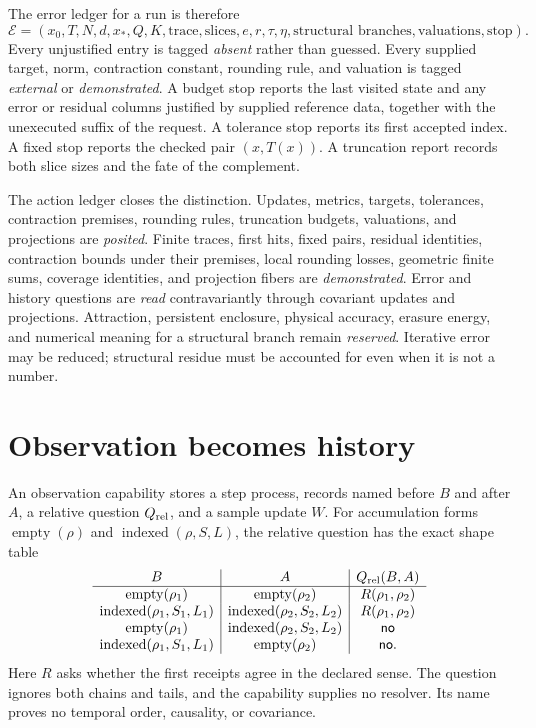 The error ledger for a run is therefore
\[
 \mathcal E=(x_0,T,N,d,x_*,Q,K,\text{trace},\text{slices},
             e,r,\tau,\eta,\text{structural branches},\text{valuations},\text{stop}).
\]
Every unjustified entry is tagged \emph{absent} rather than guessed.  Every supplied target, norm, contraction
constant, rounding rule, and valuation is tagged \emph{external} or \emph{demonstrated}.  A budget stop reports the
last visited state and any error or residual columns justified by supplied reference data, together with the
unexecuted suffix of the request.  A tolerance stop reports its first accepted index.  A fixed stop reports the checked
pair \((x,T(x))\).  A truncation report records both slice sizes and the fate of the complement.

The action ledger closes the distinction.  Updates, metrics, targets, tolerances, contraction premises, rounding rules,
truncation budgets, valuations, and projections are \emph{posited}.  Finite traces, first hits, fixed pairs, residual
identities, contraction bounds under their premises, local rounding losses, geometric finite sums, coverage identities,
and projection fibers are \emph{demonstrated}.  Error and history questions are \emph{read}
contravariantly through covariant updates and projections.  Attraction, persistent enclosure, physical accuracy,
erasure energy, and numerical meaning for a structural branch remain \emph{reserved}.  Iterative error may be reduced;
structural residue must be accounted for even when it is not a number.

\section{Observation becomes history}

An observation capability stores a step process, records named before \(B\) and after \(A\), a relative question
\(Q_{\rm rel}\), and a sample update \(W\).  For accumulation forms
\(\operatorname{empty}(\rho)\) and \(\operatorname{indexed}(\rho,S,L)\), the relative question has the exact shape table
\[
\begin{array}{c|c|c}
B&A&Q_{\rm rel}(B,A)\\
\hline
\operatorname{empty}(\rho_1)&\operatorname{empty}(\rho_2)&R(\rho_1,\rho_2)\\
\operatorname{indexed}(\rho_1,S_1,L_1)&\operatorname{indexed}(\rho_2,S_2,L_2)&R(\rho_1,\rho_2)\\
\operatorname{empty}(\rho_1)&\operatorname{indexed}(\rho_2,S_2,L_2)&\mathsf{no}\\
\operatorname{indexed}(\rho_1,S_1,L_1)&\operatorname{empty}(\rho_2)&\mathsf{no}.
\end{array}
\]
Here \(R\) asks whether the first receipts agree in the declared sense.  The question ignores both chains and tails,
and the capability supplies no resolver.  Its name proves no temporal order, causality, or covariance.

